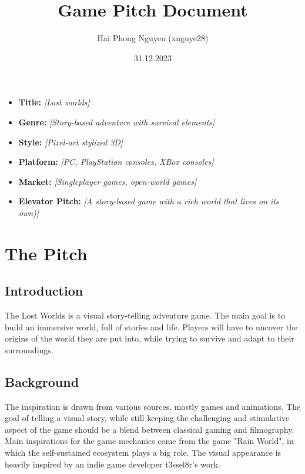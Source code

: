 \documentclass[a4paper,10pt,english]{article}
\title{%
Game Pitch Document%
}
\author{%
Hai Phong Nguyen (xnguye28)%
}
\date{31.12.2023}
\newcommand{\ph}[1]{\textit{[#1]}}
\begin{document}
\maketitle
\thispagestyle{empty}

{%
\large

\begin{itemize}

\item[] \textbf{Title:} \ph{Lost worlds}

\item[] \textbf{Genre:} \ph{Story-based adventure with survival elements}

\item[] \textbf{Style:} \ph{Pixel-art stylized 3D}

\item[] \textbf{Platform:} \ph{PC, PlayStation consoles, XBox consoles}

\item[] \textbf{Market:} \ph{Singleplayer games, open-world games}

\item[] \textbf{Elevator Pitch:} \ph{A story-based game with a rich world that lives on its own)}

\end{itemize}

}

\section*{\centering The Pitch}

\subsection*{Introduction}
The Lost Worlds is a visual story-telling adventure game. The main goal is to build an immersive world, full of stories and life. Players will have to uncover the origins of the world they are put into, while trying to survive and adapt to their surroundings.
\subsection*{Background}
The inspiration is drawn from various sources, mostly games and animations. The goal of telling a visual story, while still keeping the challenging and stimulative aspect of the game should be a blend between classical gaming and filmography. Main inspirations for the game mechanics come from the game "Rain World", in which the self-sustained ecosystem plays a big role. The visual appearance is heavily inspired by an indie game developer t3ssel8r's work.
\end{document}
